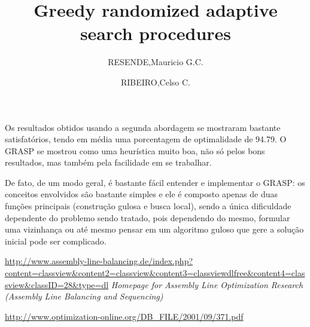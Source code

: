 \documentclass{report}
\begin{document}
Os resultados obtidos usando a segunda abordagem se mostraram bastante
satisfatórios, tendo em média uma porcentagem de optimalidade de 94.79. O
GRASP se mostrou como uma heurística muito boa, não só pelos bons resultados,
mas também pela facilidade em se
trabalhar.

De fato, de um modo geral, é bastante fácil entender e implementar o GRASP:
os conceitos envolvidos são bastante simples e ele é composto apenas de duas
funções principais (construção gulosa e busca local), sendo a única
dificuldade dependente do problemo sendo tratado, pois dependendo do mesmo,
formular uma vizinhança ou até mesmo pensar
em um algoritmo guloso que gere a solução inicial pode ser complicado.



	\url{http://www.assembly-line-balancing.de/index.php?content=classview&content2=classview&content3=classviewdlfree&content4=classview&classID=28&type=dl}
	\emph{Homepage for Assembly Line Optimization Research (Assembly Line Balancing and Sequencing)}


	\url{http://www.optimization-online.org/DB_FILE/2001/09/371.pdf}
	\title{Greedy randomized adaptive search procedures}
	\author{RESENDE,Mauricio G.C. \and RIBEIRO,Celso C.}
\end{document}
